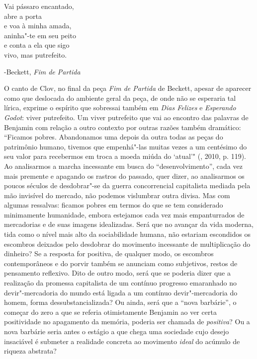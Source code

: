 \epigraph{Vai pássaro encantado,\\
abre a porta\\
e voa à minha amada,\\
aninha"-te em seu peito\\
e conta a ela que sigo\\
vivo, mas putrefeito.}{-Beckett, \emph{Fim de Partida}}

O canto de Clov, no final da peça \emph{Fim de Partida} de Beckett,
apesar de aparecer como que deslocada do ambiente geral da
peça, de onde não se esperaria tal lírica, exprime o espírito que
sobressai também em \emph{Dias Felizes} e \emph{Esperando Godot}:
viver putrefeito. Um viver putrefeito que vai ao encontro das
palavras de Benjamin com relação a outro contexto por outras razões
também dramático: ``Ficamos pobres. Abandonamos uma depois da outra
todas as peças do patrimônio humano, tivemos que empenhá"-las muitas
vezes a um centésimo do seu valor para recebermos em troca a moeda miúda
do `atual'" (, 2010, p. 119). Ao analisarmos a marcha
incessante em busca do ``desenvolvimento'', cada vez mais premente e
apagando os rastros do passado, quer dizer, ao analisarmos os poucos
séculos de desdobrar"-se da guerra concorrencial capitalista mediada pela
mão invisível do mercado, não podemos vislumbrar outra divisa. Mas com
algumas ressalvas: ficamos pobres em termos do que se tem considerado
minimamente humanidade, embora estejamos cada vez mais empanturrados de
mercadorias e de suas imagens idealizadas. Será que no avançar da vida
moderna, tida como o nível mais alto da sociabilidade humana, não
estariam escondidos os escombros deixados pelo desdobrar do movimento
incessante de multiplicação do dinheiro? Se a resposta for positiva, de
qualquer modo, os escombros contemporâneos e do porvir também se
anunciam como subjetivos, restos de pensamento reflexivo. Dito de outro
modo, será que se poderia dizer que a realização da promessa capitalista
de um contínuo progresso emaranhado no devir"-mercadoria do mundo está
ligada a um contínuo devir"-mercadoria do homem, forma
dessubstancializada? Ou ainda, será que a ``nova barbárie'', o começar
do zero a que se referia otimistamente Benjamin ao ver
certa positividade no apagamento da memória, poderia ser chamada de
\emph{positiva}? Ou a nova barbárie seria antes o estágio a que chega
uma sociedade cujo desejo insaciável é submeter a realidade concreta ao
movimento \emph{ideal} do acúmulo de riqueza abstrata?

